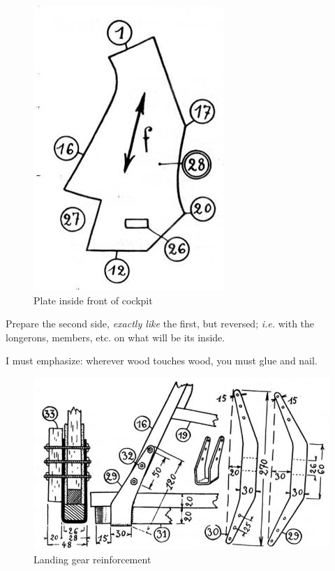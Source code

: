 \documentclass{book}
\begin{document}
\begin{center}
  \begin{figure}
    \includegraphics[width=0.5\linewidth]{fig-19.jpg}
    \caption{Plate inside front of cockpit}
    \label{fig:nineteen}
  \end{figure}
\end{center}

Prepare the second side, \textit{exactly like} the first, but
reversed; \textit{i.e.} with the longerons, members, etc. on what will
be its inside.

I must emphasize: wherever wood touches wood, you must glue and nail.

\begin{figure}
  \includegraphics[width=\linewidth]{fig-20.jpg}
  \caption{Landing gear reinforcement}
  \label{fig:twenty}
\end{figure}
\end{document}
